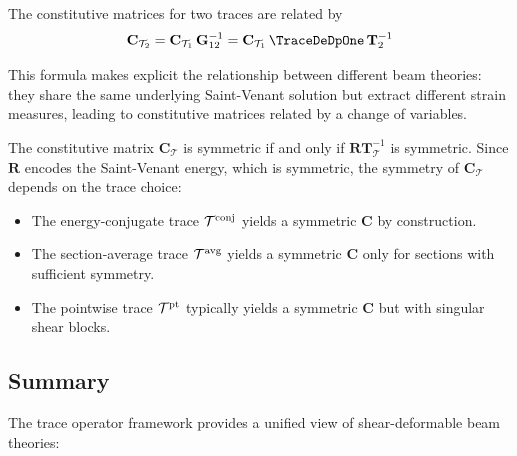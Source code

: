 \begin{corollary}
\label{cor:constitutive-transform}
The constitutive matrices for two traces are related by
\begin{equation}
\mathbf{C}_{\mathcal{T}_2} = \mathbf{C}_{\mathcal{T}_1} \, \mathbf{G}_{12}^{-1} 
= \mathbf{C}_{\mathcal{T}_1} \, \TraceDeDpOne \, \mathbf{T}_2^{-1}
\label{eq:constitutive-transform}
\end{equation}
\end{corollary}

This formula makes explicit the relationship between different beam theories: 
they share the same underlying Saint-Venant solution but extract different 
strain measures, leading to constitutive matrices related by a change of variables.

\begin{remark}
The constitutive matrix $\mathbf{C}_{\mathcal{T}}$ is symmetric if and only if 
$\mathbf{R} \mathbf{T}_{\mathcal{T}}^{-1}$ is symmetric. Since $\mathbf{R}$ 
encodes the Saint-Venant energy, which is symmetric, the symmetry of 
$\mathbf{C}_{\mathcal{T}}$ depends on the trace choice:
\begin{itemize}
\item The energy-conjugate trace $\mathcal{T}^{\rm conj}$ yields a symmetric 
$\mathbf{C}$ by construction.
\item The section-average trace $\mathcal{T}^{\rm avg}$ yields a symmetric 
$\mathbf{C}$ only for sections with sufficient symmetry.
\item The pointwise trace $\mathcal{T}^{\rm pt}$ typically yields a symmetric 
$\mathbf{C}$ but with singular shear blocks.
\end{itemize}
\end{remark}



\subsection{Summary}

The trace operator framework provides a unified view of shear-deformable beam theories:


